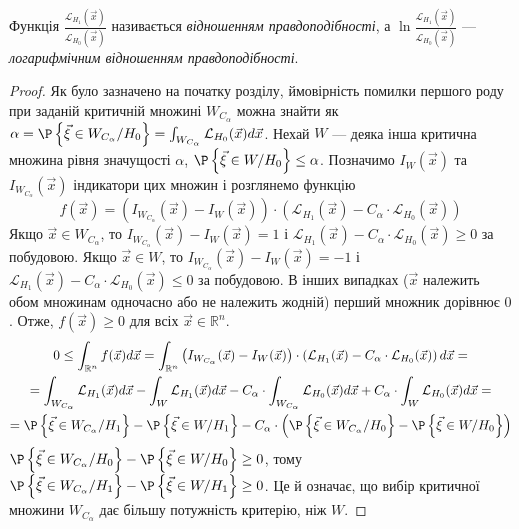 \begin{remark}
    Функція $\frac{\mathcal{L}_{H_1}(\vec{x})}{\mathcal{L}_{H_0}(\vec{x})}$ називається
    \emph{відношенням правдоподібності}, а $\ln \frac{\mathcal{L}_{H_1}(\vec{x})}{\mathcal{L}_{H_0}(\vec{x})}$ ---
    \emph{логарифмічним відношенням правдоподібності}.
\end{remark}
\begin{proof}
    Як було зазначено на початку розділу, ймовірність помилки першого роду при заданій критичній множині $W_{C_\alpha}$ можна знайти як
    $\alpha = \P\left\{ \vec{\xi} \in W_{C_\alpha} / H_0\right\} = \int_{W_{C_\alpha}} \mathcal{L}_{H_0}(\vec{x}) d\vec{x}$.
    Нехай $W$ --- деяка інша критична множина рівня значущості $\alpha$, 
    $\P\left\{ \vec{\xi} \in W / H_0\right\} \leq \alpha$. Позначимо $I_W(\vec{x})$ та $I_{W_{C_\alpha}}(\vec{x})$ індикатори цих множин і
    розглянемо функцію 
    $$f(\vec{x}) = \left(I_{W_{C_\alpha}}(\vec{x}) - I_W(\vec{x})\right)\cdot \left(\mathcal{L}_{H_1}(\vec{x}) - C_{\alpha} \cdot \mathcal{L}_{H_0}(\vec{x})\right)$$
    Якщо $\vec{x} \in W_{C_\alpha}$, то $I_{W_{C_\alpha}}(\vec{x}) - I_W(\vec{x}) = 1$ і 
    $\mathcal{L}_{H_1}(\vec{x}) - C_{\alpha} \cdot \mathcal{L}_{H_0}(\vec{x}) \geq 0$ за побудовою.
    Якщо $\vec{x} \in W$, то $I_{W_{C_\alpha}}(\vec{x}) - I_W(\vec{x}) = -1$ і 
    $\mathcal{L}_{H_1}(\vec{x}) - C_{\alpha} \cdot \mathcal{L}_{H_0}(\vec{x}) \leq 0$ за побудовою.
    В інших випадках ($\vec{x}$ належить обом множинам одночасно або не належить жодній) перший множник дорівнює $0$.
    Отже, $f(\vec{x}) \geq 0$ для всіх $\vec{x} \in \mathbb{R}^n$.
    \begin{gather*}
        0 \leq \int_{\mathbb{R}^n} f(\vec{x}) d\vec{x} = 
        \int_{\mathbb{R}^n} \left(I_{W_{C_\alpha}}(\vec{x}) - I_W(\vec{x})\right)\cdot \left(\mathcal{L}_{H_1}(\vec{x}) - C_{\alpha} \cdot \mathcal{L}_{H_0}(\vec{x})\right) d\vec{x} =\\
        = \int_{W_{C_\alpha}} \mathcal{L}_{H_1}(\vec{x}) d\vec{x} - \int_{W} \mathcal{L}_{H_1}(\vec{x}) d\vec{x}
        - C_{\alpha} \cdot \int_{W_{C_\alpha}} \mathcal{L}_{H_0}(\vec{x}) d\vec{x} +
        C_{\alpha} \cdot \int_{W} \mathcal{L}_{H_0}(\vec{x}) d\vec{x} = \\
        = \P\left\{ \vec{\xi} \in W_{C_\alpha} / H_1\right\} - \P\left\{ \vec{\xi} \in W / H_1\right\} -
        C_{\alpha}\cdot\left(\P\left\{ \vec{\xi} \in W_{C_\alpha} / H_0\right\} - \P\left\{ \vec{\xi} \in W / H_0\right\}\right)
    \end{gather*}
    $\P\left\{ \vec{\xi} \in W_{C_\alpha} / H_0\right\} - \P\left\{ \vec{\xi} \in W / H_0\right\} \geq 0$, тому
    $\P\left\{ \vec{\xi} \in W_{C_\alpha} / H_1\right\} - \P\left\{ \vec{\xi} \in W / H_1\right\} \geq 0$. 
    Це й означає, що вибір критичної множини $W_{C_\alpha}$ дає більшу потужність критерію, ніж $W$.
\end{proof}

